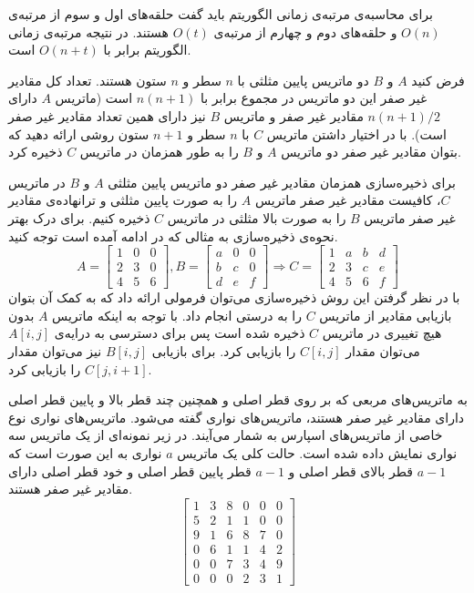 برای محاسبه‌ی مرتبه‌ی زمانی الگوریتم {} باید گفت حلقه‌های اول و سوم از مرتبه‌ی {$O(n)$} و حلقه‌های دوم و چهارم از مرتبه‌ی {$O(t)$} هستند. در نتیجه مرتبه‌ی زمانی الگوریتم {} برابر با {$O(n+t)$} است.


 فرض کنید {$A$} و {$B$} دو ماتریس پایین مثلثی با {$n$} سطر و {$n$} ستون هستند. تعداد کل مقادیر غیر صفر این دو ماتریس در مجموع برابر با {$n(n+1)$} است (ماتریس {$A$} دارای {$n(n+1)/2$} مقادیر غیر صفر و ماتریس {$B$} نیز دارای همین تعداد مقادیر غیر صفر است). با در اختیار داشتن ماتریس {$C$} با {$n$} سطر و  {$n+1$} ستون روشی ارائه دهید که بتوان مقادیر غیر صفر دو ماتریس {$A$} و {$B$} را به طور همزمان در ماتریس {$C$} ذخیره کرد.


برای ذخیره‌سازی همزمان مقادیر غیر صفر دو ماتریس پایین مثلثی {$A$} و {$B$} در ماتریس {$C$}، کافیست مقادیر غیر صفر ماتریس {$A$} را به صورت پایین مثلثی و ترانهاده‌ی مقادیر غیر صفر ماتریس {$B$} را به صورت بالا مثلثی در ماتریس {$C$} ذخیره کنیم. برای درک بهتر نحوه‌ی ذخیره‌سازی به مثالی که در ادامه آمده است توجه کنید.
\begin{displaymath}
A=
\begin{bmatrix}
1 & 0 & 0 \\
2 & 3 & 0 \\
4 & 5 & 6
\end{bmatrix},
B=
\begin{bmatrix}
a & 0 & 0 \\
b & c & 0 \\
d & e & f
\end{bmatrix}
\Rightarrow C=
\begin{bmatrix}
1 & a & b & d \\
2 & 3 & c & e \\
4 & 5 & 6 & f
\end{bmatrix}
\end{displaymath}
با در نظر گرفتن این روش ذخیره‌سازی می‌توان فرمولی ارائه داد که به کمک آن بتوان بازیابی مقادیر از ماتریس {$C$} را به درستی انجام داد. با توجه به اینکه ماتریس {$A$} بدون هیچ تغییری در ماتریس {$C$} ذخیره شده است پس برای دسترسی به درایه‌ی {$A[i,j]$} می‌توان مقدار {$C[i,j]$} را بازیابی کرد. برای بازیابی {$B[i,j]$} نیز می‌توان مقدار {$C[j,i+1]$} را بازیابی کرد.

 به ماتریس‌های مربعی که بر روی قطر اصلی و همچنین چند قطر بالا و پایین قطر اصلی دارای مقادیر غیر صفر هستند، ماتریس‌های نواری گفته می‌شود. ماتریس‌های نواری نوع خاصی از ماتریس‌های اسپارس به شمار می‌آیند. در زیر نمونه‌ای از یک ماتریس سه نواری نمایش داده شده است. حالت کلی یک ماتریس‌ {$a$} نواری به این صورت است که {$a-1$} قطر بالای قطر اصلی و {$a-1$} قطر پایین قطر اصلی و خود قطر اصلی دارای مقادیر غیر صفر هستند. 
$$
\begin{bmatrix}
1 & 3 & 8 & 0 & 0 & 0\\
5 & 2 & 1 & 1 & 0 & 0\\
9 & 1 & 6 & 8 & 7 & 0\\
0 & 6 & 1 & 1 & 4 & 2\\
0 & 0 & 7 & 3 & 4 & 9\\
0 & 0 & 0 & 2 & 3 & 1
\end{bmatrix}
$$

